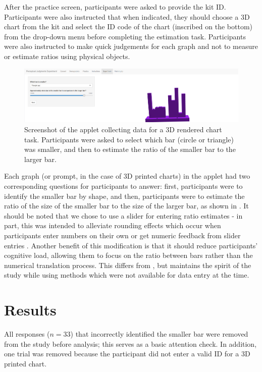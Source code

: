 \documentclass[letterpaper,inpress,dvipsnames]{jdsart}
\begin{document}
After the practice screen, participants were asked to provide the kit ID. Participants were also instructed that when indicated, they should choose a 3D chart from the kit and select the ID code of the chart (inscribed on the bottom) from the drop-down menu before completing the estimation task.
Participants were also instructed to make quick judgements for each graph and not to measure or estimate ratios using physical objects.

\begin{figure}
\includegraphics[width=0.8\linewidth]{_images/05-Experiment-05-filled-in} \caption{Screenshot of the applet collecting data for a 3D rendered chart task. Participants were asked to select which bar (circle or triangle) was smaller, and then to estimate the ratio of the smaller bar to the larger bar.}\label{fig:experiment3dRender}
\end{figure}

Each graph (or prompt, in the case of 3D printed charts) in the applet had two corresponding questions for participants to answer: first, participants were to identify the smaller bar by shape, and then, participants were to estimate the ratio of the size of the smaller bar to the size of the larger bar, as shown in .
It should be noted that we chose to use a slider for entering ratio estimates - in part, this was intended to alleviate rounding effects which occur when participants enter numbers on their own or get numeric feedback from slider entries \citep{ruudUncertaintyCausesRounding2014a, maineriSliderBarsMultiDevice2021}.
Another benefit of this modification is that it should reduce participants' cognitive load, allowing them to focus on the ratio between bars rather than the numerical translation process.
This differs from \citet{clevelandGraphical1984}, but maintains the spirit of the study while using methods which were not available for data entry at the time.

\hypertarget{results}{%
\section{Results}\label{results}}

All responses (\(n = 33\)) that incorrectly identified the smaller bar were removed from the study before analysis; this serves as a basic attention check. In addition, one trial was removed because the participant did not enter a valid ID for a 3D printed chart.
\end{document}
